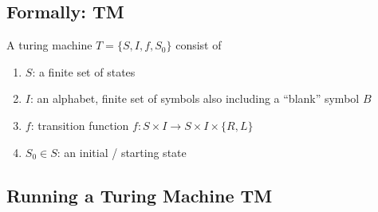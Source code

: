 \documentclass[11pt]{article}
\begin{document}
\subsection{Formally: TM}
A turing machine $T=\{S,I,f,S_0\}$ consist of 
\begin{enumerate}
    \item $S$: a finite set of states 
    \item $I$: an alphabet, finite set of symbols also including a ``blank'' symbol $B$
    \item $f$: transition function $f:S\times I\rightarrow S\times I\times\{R,L\}$
    \item $S_0\in S$: an initial / starting state 
\end{enumerate}
\subsection{Running a Turing Machine TM}
\end{document}
